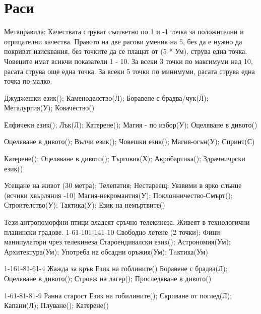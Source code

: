 \section{Раси}
Метаправила:
Качествата струват съответно по 1 и -1 точка за положителни и отрицателни качества.
Правото на две расови умения на 5, без да е нужно да покриват изисквания, без точките да се плащат от (5 * Ум), струва една точка.
Човеците имат всикчи показатели 1 - 10.
За всеки 3 точки по максимуми над 10, расата струва още една точка.
За всеки 5 точки по минимуми, расата струва една точка по-малко.
\\
\begin{multicols}{2}

{
Джуджешки език();
Каменоделство(Л);
Боравене с брадва/чук(Л);
Металургия(У);
Ковачество()
}

{
Елфичеки език();
Лък(Л);
Катерене();
Магия - по избор(У);
Оцеляване в дивото()
}

{
Оцеляване в дивото();
Вълчи език();
Човешки език();
Магия-огън(У);
Спринт(С)
}

{
Катерене();
Оцеляване в дивото();
Търговия(Х);
Акробартика();
Здрачничрски език()
}

{
Усещане на живот (30 метра);
Телепатия;
Нестареещ;
Уязвими в ярко слънце (всчики хвърляния -10)
}
{
Магия-некромантия(У);
Поклонничество-Смърт();
Строителство(У);
Тактика(У);
Език на немъртвите()
}

{Тези антропоморфни птици владеят сръчно телекинеза. Живеят в технологични планински градове.}
{1-6}{1-10}{1-14}{1-10}
{
Свободно летене (2 точки);
Фини манипулатори чрез телекинеза
}
{
Староендивалски език();
Астрономия(Ум);
Архитектура(Ум);
Употреба на обсадни оръжия(Ум);
Тaктика(Ум)
}

{}
{1-16}{1-8}{1-6}{1-4}
{
Жажда за кръв
}
{
Език на гоблините()
Боравене с брадва(Л);
Оцеляване в дивото();
Строеж на лагер();
Проследяване в дивото()
}

{}
{1-6}{1-8}{1-8}{1-9}
{
Ранна старост
}
{
Език на гобилините();
Скриване от поглед(Л);
Капани(Л);
Плуване();
Катерене()
}

\end{multicols}
